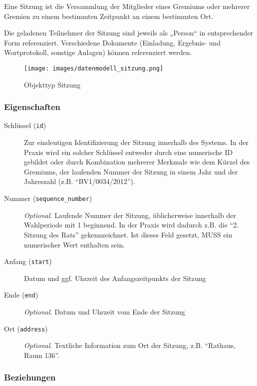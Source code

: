 \documentclass[,a4paper]{article}
\makeatletter
\def\maxwidth{\ifdim\Gin@nat@width>\linewidth\linewidth
\else\Gin@nat@width\fi}
\let\Oldincludegraphics\includegraphics
\renewcommand{\includegraphics}[1]{\Oldincludegraphics[width=\maxwidth]{#1}}
\makeatother
\begin{document}
Eine Sitzung ist die Versammlung der Mitglieder eines Gremiums oder
mehrerer Gremien zu einem bestimmten Zeitpunkt an einem bestimmten Ort.

Die geladenen Teilnehmer der Sitzung sind jeweils als „Person`` in
entsprechender Form referenziert. Verschiedene Dokumente (Einladung,
Ergebnis- und Wortprotokoll, sonstige Anlagen) können referenziert
werden.

\begin{figure}[htbp]
\centering
\texttt{[image: images/datenmodell\_sitzung.png]}
\caption{Objekttyp Sitzung}
\end{figure}

\subsubsection{Eigenschaften}

\begin{description}
\item[Schlüssel (\texttt{id})]
Zur eindeutigen Identifizierung der Sitzung innerhalb des Systems. In
der Praxis wird ein solcher Schlüssel entweder durch eine numerische ID
gebildet oder durch Kombination mehrerer Merkmale wie dem Kürzel des
Gremiums, der laufenden Nummer der Sitzung in einem Jahr und der
Jahreszahl (z.B. ``BV1/0034/2012'').
\item[Nummer (\texttt{sequence\_number})]
\emph{Optional}. Laufende Nummer der Sitzung, üblicherweise innerhalb
der Wahlperiode mit 1 beginnend. In der Praxis wird dadurch z.B. die
``2. Sitzung des Rats'' gekennzeichnet. Ist dieses Feld gesetzt, MUSS
ein numerischer Wert enthalten sein.
\item[Anfang (\texttt{start})]
Datum und ggf. Uhrzeit des Anfangszeitpunkts der Sitzung
\item[Ende (\texttt{end})]
\emph{Optional}. Datum und Uhrzeit vom Ende der Sitzung
\item[Ort (\texttt{address})]
\emph{Optional}. Textliche Information zum Ort der Sitzung, z.B.
``Rathaus, Raum 136''.
\end{description}

\subsubsection{Beziehungen}
\end{document}
